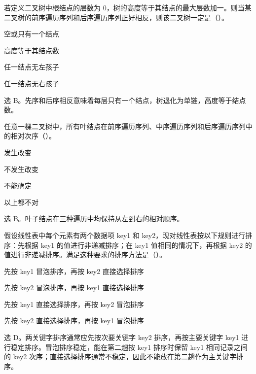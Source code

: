 \begin{question}
若定义二叉树中根结点的层数为 $0$，树的高度等于其结点的最大层数加一。则当某二叉树的前序遍历序列和后序遍历序列正好相反，则该二叉树一定是（\quad）。
\begin{choiceoptions}[2]
  \item 空或只有一个结点
  \item 高度等于其结点数
  \item 任一结点无左孩子
  \item 任一结点无右孩子
\end{choiceoptions}
\begin{solution}
选 B。先序和后序相反意味着每层只有一个结点，树退化为单链，高度等于结点数。
\end{solution}
\end{question}

\begin{question}
任意一棵二叉树中，所有叶结点在前序遍历序列、中序遍历序列和后序遍历序列中的相对次序（\quad）。
\begin{choiceoptions}[2]
  \item 发生改变
  \item 不发生改变
  \item 不能确定
  \item 以上都不对
\end{choiceoptions}
\begin{solution}
选 B。叶子结点在三种遍历中均保持从左到右的相对顺序。
\end{solution}
\end{question}

\begin{question}
假设线性表中每个元素有两个数据项 key1 和 key2，现对线性表按以下规则进行排序：先根据 key1 的值进行非递减排序；在 key1 值相同的情况下，再根据 key2 的值进行非递减排序。满足这种要求的排序方法是（\quad）。
\begin{choiceoptions}[1]
  \item 先按 key1 冒泡排序，再按 key2 直接选择排序
  \item 先按 key2 冒泡排序，再按 key1 直接选择排序
  \item 先按 key1 直接选择排序，再按 key2 冒泡排序
  \item 先按 key2 直接选择排序，再按 key1 冒泡排序
\end{choiceoptions}
\begin{solution}
选 D。两关键字排序通常应先按次要关键字 key2 排序，再按主要关键字 key1 进行稳定排序。冒泡排序稳定，能在第二趟按 key1 排序时保留 key1 相同记录之间的 key2 次序；直接选择排序通常不稳定，因此不能放在第二趟作为主关键字排序。
\end{solution}
\end{question}

